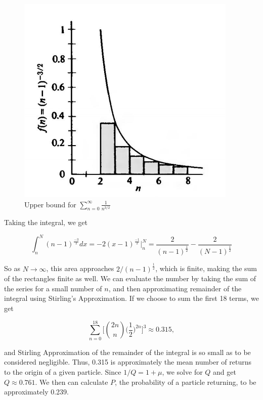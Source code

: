\documentclass[11pt]{article}
\begin{document}
\begin{figure}[H]
\centering
\includegraphics[scale = 1]{UpperBound}
\caption{Upper bound for $\sum_{n=0}^{\infty} \frac{1}{n^{3/2}}$ \protect\cite{50}}
\label{fig:UpperBound}
\end{figure}


\noindent Taking the integral, we get 

\begin{equation}
\int_{n}^{N} (n-1)^{\frac{-3}{2}} dx = -2(x - 1)^{\frac{-1}{2}} \bigg\rvert_{n}^{N} = \frac{2}{(n - 1)^{\frac{1}{2}}} - \frac{2}{(N - 1)^{\frac{1}{2}}}
\end{equation}

So as $N \to \infty$, this area approaches $2/(n - 1)^{\frac{1}{2}}$, which is finite, making the sum of the rectangles finite as well. We can evaluate the number by taking the sum of the series for a small number of $n$, and then approximating remainder of the integral using Stirling's Approximation. If we choose to sum the first 18 terms, we get

 \begin{equation}
\sum_{n=0}^{18} \bigg[{2n \choose n}\bigg(\frac{1}{2}\bigg)^{2n}\bigg]^{3} \approx 0.315,
 \end{equation}
 
\noindent and Stirling Approximation of the remainder of the integral is so small as to be considered negligible. Thus, 0.315 is approximately the mean number of returns to the origin of a given particle. Since $1/Q = 1 + \mu$, we solve for $Q$ and get $Q \approx 0.761$. We then can calculate $P$, the probability of a particle returning, to be approximately 0.239.
\end{document}
